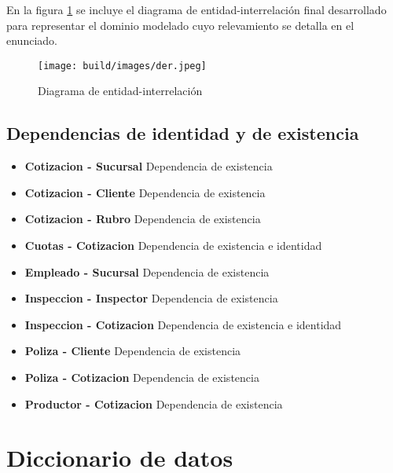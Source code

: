 \documentclass[a4paper,11pt]{article}
\begin{document}
 En la figura \ref{fig:der} se incluye el diagrama de entidad-interrelación
 final desarrollado para representar el dominio modelado cuyo relevamiento se
 detalla en el enunciado.

\begin{figure}[h!t]
  \centering
  \texttt{[image: build/images/der.jpeg]}
  \caption{Diagrama de entidad-interrelación} \label{fig:der}
\end{figure}

\FloatBarrier


\subsection{Dependencias de identidad y de existencia}

\begin{itemize}

  \item \textbf{Cotizacion - Sucursal}	Dependencia de existencia	
  
  \item \textbf{Cotizacion - Cliente}	Dependencia de existencia	

  \item \textbf{Cotizacion - Rubro}	Dependencia de existencia	

  \item \textbf{Cuotas - Cotizacion}	Dependencia de existencia e identidad

  \item \textbf{Empleado - Sucursal}	Dependencia de existencia	

  \item \textbf{Inspeccion - Inspector}	Dependencia de existencia	

  \item \textbf{Inspeccion - Cotizacion}	Dependencia de existencia e identidad 

  \item \textbf{Poliza - Cliente}	Dependencia de existencia	

  \item \textbf{Poliza - Cotizacion}	Dependencia de existencia	

  \item \textbf{Productor - Cotizacion}	Dependencia de existencia	

\end{itemize}

\section{Diccionario de datos}
\end{document}

